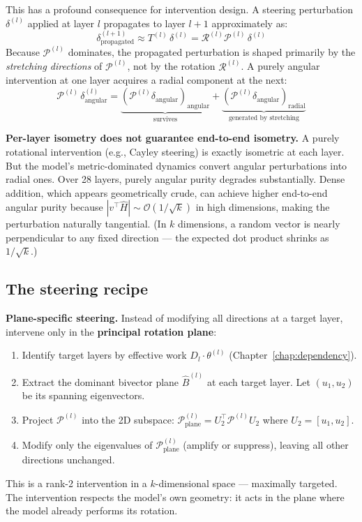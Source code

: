 \documentclass[11pt, twoside, openright]{memoir}
\newcommand{\rotor}[1]{\mathcal{R}^{(#1)}}  %
\newcommand{\metric}[1]{\mathcal{P}^{(#1)}} %
\numberwithin{equation}{chapter}
\begin{document}
This has a profound consequence for intervention design.  A steering
perturbation $\delta^{(l)}$ applied at layer $l$ propagates to layer
$l+1$ approximately as:
\begin{equation}
  \delta_{\text{propagated}}^{(l+1)} \approx
  T^{(l)} \, \delta^{(l)} = \rotor{l} \metric{l} \, \delta^{(l)}
\end{equation}
Because $\metric{l}$ dominates, the propagated perturbation is shaped
primarily by the \emph{stretching directions} of $\metric{l}$, not
by the rotation $\rotor{l}$.  A purely angular intervention at one
layer acquires a radial component at the next:
\begin{equation}
  \metric{l}\,\delta_{\text{angular}}^{(l)} =
  \underbrace{(\metric{l}\delta_{\text{angular}})_{\text{angular}}}_{\text{survives}}
  + \underbrace{(\metric{l}\delta_{\text{angular}})_{\text{radial}}}_{\text{generated by stretching}}
\end{equation}

\begin{pitfall}
\textbf{Per-layer isometry does not guarantee end-to-end isometry.}
A purely rotational intervention (e.g., Cayley steering) is exactly
isometric at each layer.  But the model's metric-dominated dynamics
convert angular perturbations into radial ones.  Over 28 layers,
purely angular purity degrades substantially.  Dense addition, which
appears geometrically crude, can achieve higher end-to-end angular
purity because $|v^\top \hat{H}| \sim \mathcal{O}(1/\sqrt{k})$ in
high dimensions, making the perturbation naturally tangential.
(In $k$ dimensions, a random vector is nearly perpendicular to any
fixed direction --- the expected dot product shrinks as $1/\sqrt{k}$.)
\end{pitfall}

\subsection{The steering recipe}

\begin{keyidea}
\textbf{Plane-specific steering.}
Instead of modifying all directions at a target layer, intervene only
in the \textbf{principal rotation plane}:
\begin{enumerate}[nosep]
\item Identify target layers by effective work $D_l \cdot \theta^{(l)}$
  (Chapter~\ref{chap:dependency}).
\item Extract the dominant bivector plane $\hat{B}^{(l)}$ at each
  target layer.  Let $(u_1, u_2)$ be its spanning eigenvectors.
\item Project $\metric{l}$ into the 2D subspace:
  $\metric{l}_{\text{plane}} = U_2^\top \metric{l} U_2$ where
  $U_2 = [u_1, u_2]$.
\item Modify only the eigenvalues of $\metric{l}_{\text{plane}}$
  (amplify or suppress), leaving all other directions unchanged.
\end{enumerate}
This is a rank-2 intervention in a $k$-dimensional space --- maximally
targeted.  The intervention respects the model's own geometry: it acts
in the plane where the model already performs its rotation.
\end{keyidea}
\end{document}
